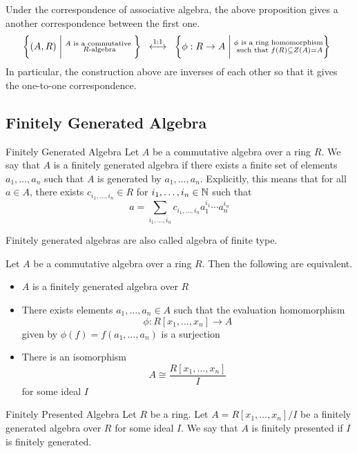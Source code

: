 \documentclass[a4paper]{article}
\begin{document}
Under the correspondence of associative algebra, the above proposition gives a another correspondence between the first one. $$\left\{(A,R)\;\bigg{|}\;\substack{A\text{ is a commutative }\\R\text{-algebra}}\right\}\;\;\overset{1:1}{\longleftrightarrow}\;\;\left\{\phi:R\to A\;\bigg{|}\;\substack{\phi\text{ is a ring homomorphism}\\\text{ such that }f(R)\subseteq Z(A)=A}\right\}\;\;$$ In particular, the construction above are inverses of each other so that it gives the one-to-one correspondence. 

\subsection{Finitely Generated Algebra}
\begin{defn}{Finitely Generated Algebra}{} Let $A$ be a commutative algebra over a ring $R$. We say that $A$ is a finitely generated algebra if there exists a finite set of elements $a_1,\dots,a_n$ such that $A$ is generated by $a_1,\dots,a_n$. Explicitly, this means that for all $a\in A$, there exists $c_{i_1,\dots,i_n}\in R$ for $i_1,\dots,i_n\in\mathbb{N}$ such that $$a=\sum_{i_1,\dots,i_n} c_{i_1,\dots,i_n}a_1^{i_1}\cdots a_n^{i_n}$$
\end{defn}

Finitely generated algebras are also called algebra of finite type. 

\begin{thm}{}{} Let $A$ be a commutative algebra over a ring $R$. Then the following are equivalent. 
\begin{itemize}
\item $A$ is a finitely generated algebra over $R$
\item There exists elements $a_1,\dots,a_n\in A$ such that the evaluation homomorphism $$\phi:R[x_1,\dots,x_n]\to A$$ given by $\phi(f)=f(a_1,\dots,a_n)$ is a surjection
\item There is an isomorphism $$A\cong\frac{R[x_1,\dots,x_n]}{I}$$ for some ideal $I$
\end{itemize}
\end{thm}

\begin{defn}{Finitely Presented Algebra}{} Let $R$ be a ring. Let $A=R[x_1,\dots,x_n]/I$ be a finitely generated algebra over $R$ for some ideal $I$. We say that $A$ is finitely presented if $I$ is finitely generated. 
\end{defn}
\end{document}
